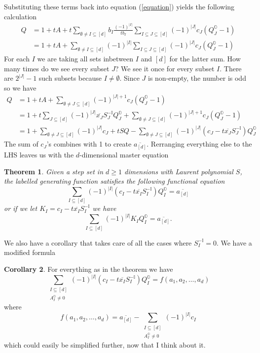 \documentclass[12pt]{article}
\newcommand{\oo}{\mathbb{O}}
\newcommand{\one}{\mathbb{I}}
\newtheorem{theorem}{Theorem}
\theoremstyle{definition} \newtheorem{definition}[theorem]{Definition}
\newtheorem{corollary}[theorem]{Corollary}
\newcommand{\ol}[1]{\overline{#1}}
\begin{document}
Substituting these terms back into equation (\ref{equation}) yields the following calculation
\begin{align}
Q & = 1 + tA + t\sum_{\emptyset \neq I \subseteq [d]}b_I \frac{(-1)^{|I|}}{t b_I} \sum_{I\subseteq J \subseteq [d]}(-1)^{|J|} c_J (Q_J^\oo - 1)\\
    &= 1+ tA +\sum_{\emptyset \neq I \subseteq [d]}(-1)^{|I|} \sum_{I\subseteq J \subseteq [d]}(-1)^{|J|} c_J (Q_J^\oo - 1)
\end{align}
For each $I$ we are taking all sets inbetween $I$ and $[d]$ for the latter sum. How many times do we see every subset $J$? We see it once for every subset $I$. There are $2^{|J|} -1 $ such subsets because $I \neq \emptyset$. Since $J$ is non-empty, the number is odd so we have
\begin{align}
Q & = 1 + tA +\sum_{\emptyset \neq J \subseteq [d]}(-1)^{|J|+1} c_J (Q_J^\oo - 1)\\
   & = 1 +  t\sum_{J\subseteq [d]}(-1)^{|J|} \ol{x_J}S_{J}^{-\one}Q_{J}^{\oo} +\sum_{\emptyset \neq J \subseteq [d]}(-1)^{|J|+1} c_J (Q_J^\oo - 1)\\
   & = 1 + \sum_{\emptyset \neq J \subseteq [d]}(-1)^{|J|} c_J + tSQ  - \sum_{\emptyset \neq J \subseteq [d]}(-1)^{|J|}( c_J- t\ol{x_J}S_{J}^{-\one})Q_{J}^{\oo}
\end{align}
The sum of $c_J$'s combines with 1 to create $\ol{a_{[d]}}$. Rerranging everything else to the LHS leaves us with the $d$-dimensional master equation
\begin{theorem} Given a step set in $d\geq 1$ dimensions with Laurent polynomial $S$, the labelled generating function satisfies the following functional equation
\[
    \sum_{I \subseteq [d]}(-1)^{|I|}(c_I-t \ol{x_I}S_{I}^{-\one})Q_I^\oo = \ol{a_{[d]}}
\]
or if we let $K_I = c_I-t \ol{x_I}S_{I}^{-\one}$ we have
\[
   \sum_{I\subseteq [d]}(-1)^{|I|} K_I Q_I^\oo = \ol{a_{[d]}}.
\]
\end{theorem}
We also have a corollary that takes care of all the cases where $S_I^{-\one} = 0$. We have a modified formula
\begin{corollary} For everything as in the theorem we have
\[
     \sum_{\substack{I \subseteq [d]\\A_I^\oo \neq 0}}(-1)^{|I|}(c_I-t \ol{x_I}S_{I}^{-\one})Q_I^\oo = f(a_1,a_2,\ldots,a_d)
\]
where
\[
    f(a_1,a_2,\ldots,a_d) =  \ol{a_{[d]}} - \sum_{\substack{I \subseteq [d]\\A_I^\oo \neq 0}} (-1)^{|I|} c_I
\]
which could easily be simplified further, now that I think about it.
\end{corollary}
\end{document}
